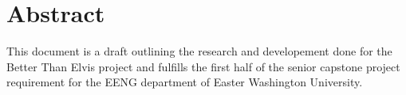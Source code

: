 \section{Abstract}
This document is a draft outlining the research and developement done for the Better Than Elvis project and fulfills the first half of the senior capstone project requirement for the EENG department of Easter Washington University. 
